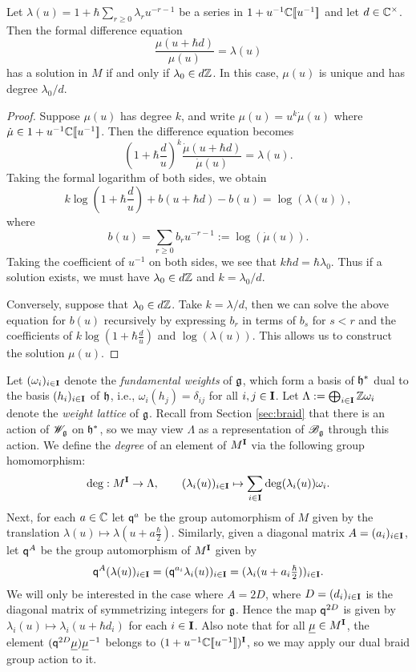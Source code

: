 \begin{lemma}\label{L:diff-eqn}
    Let $\lambda(u) = 1+\hbar\sum_{r\geq 0}\lambda_ru^{-r-1}$ be a series in $1+u^{-1}\mathbb{C}[\![u^{-1}]\!]$ and let $d\in\mathbb{C}^\times$.
    Then the formal difference equation
    \[\frac{\mu(u+\hbar d)}{\mu(u)} = \lambda(u)\]
    has a solution in $M$ if and only if $\lambda_0\in d\mathbb{Z}$.
    In this case, $\mu(u)$ is unique and has degree $\lambda_0/d$.
\end{lemma}
\begin{proof}
    Suppose $\mu(u)$ has degree $k$, and write $\mu(u)=u^k\dot{\mu}(u)$ where $\dot{\mu}\in 1+u^{-1}\mathbb{C}[\![u^{-1}]\!]$.
    Then the difference equation becomes
    \[\left(1+\hbar\frac{d}{u}\right)^k \frac{\dot{\mu}(u+\hbar d)}{\dot{\mu}(u)} = \lambda(u).\]
    Taking the formal logarithm of both sides, we obtain
    \[k\log(1+\hbar\frac{d}{u}) + b(u+\hbar d) - b(u) = \log(\lambda(u)),\]
    where
    \[b(u) = \sum_{r\geq 0}b_ru^{-r-1} := \log(\dot{\mu}(u)).\]
    Taking the coefficient of $u^{-1}$ on both sides, we see that $k\hbar d = \hbar\lambda_0$.
    Thus if a solution exists, we must have $\lambda_0\in d\mathbb{Z}$ and $k = \lambda_0/d$.

    Conversely, suppose that $\lambda_0\in d\mathbb{Z}$.
    Take $k = \lambda/d$, then we can solve the above equation for $b(u)$ recursively by expressing $b_{r}$ in terms of $b_s$ for $s<r$ and the coefficients of $k\log(1+\hbar\frac{d}{u})$ and $\log(\lambda(u))$.
    This allows us to construct the solution $\mu(u)$.
\end{proof}

Let $(\omega_i)_{i\in\mathbf{I}}$ denote the \emph{fundamental weights} of $\mathfrak{g}$, which form a basis of $\mathfrak{h}^*$ dual to the basis $(h_i)_{i\in\mathbf{I}}$ of $\mathfrak{h}$, i.e., $\omega_i(h_j) = \delta_{ij}$ for all $i,j\in\mathbf{I}$.
Let $\Lambda := \bigoplus_{i\in\mathbf{I}}\mathbb{Z}\omega_i$ denote the \emph{weight lattice} of $\mathfrak{g}$.
Recall from Section \ref{sec:braid} that there is an action of $\mathscr{W}_{\mathfrak{g}}$ on $\mathfrak{h}^*$, so we may view $\Lambda$ as a representation of $\mathscr{B}_{\mathfrak{g}}$ through this action.
We define the \emph{degree} of an element of $M^{\mathbf{I}}$ via the following group homomorphism:
\[\deg:M^{\mathbf{I}}\to\Lambda, \qquad (\lambda_i(u))_{i\in\mathbf{I}}\mapsto\sum_{i\in\mathbf{I}}\deg(\lambda_i(u))\omega_i.\]
Next, for each $a\in\mathbb{C}$ let $\mathsf{q}^a$ be the group automorphism of $M$ given by the translation $\lambda(u)\mapsto\lambda(u+a\frac{\hbar}{2})$.
Similarly, given a diagonal matrix $A = (a_i)_{i\in\mathbf{I}}$, let $\mathsf{q}^A$ be the group automorphism of $M^{\mathbf{I}}$ given by
\[\mathsf{q}^A(\lambda(u))_{i\in\mathbf{I}} = (\mathsf{q}^{a_i}\lambda_i(u))_{i\in\mathbf{I}} = (\lambda_i(u+a_i\tfrac{\hbar}{2}))_{i\in\mathbf{I}}.\]
We will only be interested in the case where $A = 2D$, where $D = (d_i)_{i\in\mathbf{I}}$ is the diagonal matrix of symmetrizing integers for $\mathfrak{g}$.
Hence the map $\mathsf{q}^{2D}$ is given by $\lambda_i(u)\mapsto\lambda_i(u+\hbar d_i)$ for each $i\in\mathbf{I}$.
Also note that for all $\underline{\mu}\in M^{\mathbf{I}}$, the element $(\mathsf{q}^{2D}\underline{\mu})\underline{\mu}^{-1}$ belongs to $(1+u^{-1}\mathbb{C}[\![u^{-1}]\!])^{\mathbf{I}}$, so we may apply our dual braid group action to it.

